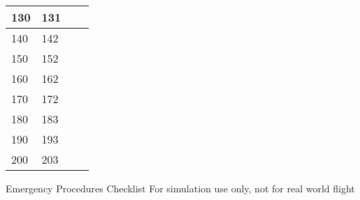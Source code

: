 \documentclass{article}
\begin{document}
\begin{multicols*}{2}
\begin{center}
\begin{tabular}{|l|l|l|l|}
        130 & 131 & \cellcolor[HTML]{9B9B9B} & \cellcolor[HTML]{9B9B9B} \\ \hline
        140 & 142 & \cellcolor[HTML]{9B9B9B} & \cellcolor[HTML]{9B9B9B} \\ \hline
        150 & 152 & \cellcolor[HTML]{9B9B9B} & \cellcolor[HTML]{9B9B9B} \\ \hline
        160 & 162 & \cellcolor[HTML]{9B9B9B} & \cellcolor[HTML]{9B9B9B} \\ \hline
        170 & 172 & \cellcolor[HTML]{9B9B9B} & \cellcolor[HTML]{9B9B9B} \\ \hline
        180 & 183 & \cellcolor[HTML]{9B9B9B} & \cellcolor[HTML]{9B9B9B} \\ \hline
        190 & 193 & \cellcolor[HTML]{9B9B9B} & \cellcolor[HTML]{9B9B9B} \\ \hline
        200 & 203 & \cellcolor[HTML]{9B9B9B} & \cellcolor[HTML]{9B9B9B} \\ \hline
    \end{tabular}
\end{center}
\end{multicols*}
\newpage
\begin{center}
    {\fontsize{20.74}{70}\selectfont Emergency Procedures Checklist}
    \break
    \color{Red}
    {\fontsize{10}{70}\selectfont For simulation use only, not for real world flight}
\end{center}
\vspace*{-2em}
\end{document}
